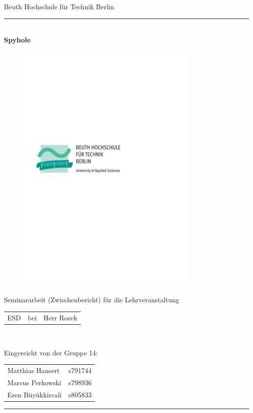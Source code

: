 

\begin{titlepage}
	\begin{center}
		\Large
		Beuth Hochschule für Technik Berlin
		\textcolor{darkBHT}{\rule{\textwidth}{0.2cm}} \\
		\vspace{2 cm}
		\Huge
		\textbf{Spyhole}
		\vspace{2 cm}
		
		\begin{figure}[htbp]
			\centering 
			\includegraphics[width=9cm]{BHT-Logo-Basis.pdf}  
		\end{figure}
		
		\vspace{3cm}
		\Large
		Seminararbeit (Zwischenbericht) für die Lehrveranstaltung \\
		\begin{tabular}{lcl}
			ESD & bei & Herr Rozek\\
		\end{tabular} 
		\\
		\vspace{0.8cm}
		\vspace{0.8cm}
		
		Eingereicht von der Gruppe 14: \\
		\begin{tabular}{ll}
			Matthias Hansert & s791744\\
			Marcus Perkowski & s798936\\
			Eren Büyükkircali & s805833\\
		\end{tabular}

	\end{center}
	\vfill
	\textcolor{darkBHT}{\rule{\textwidth}{0.2cm}}
	\vspace{1 cm}
	\normalsize
	
\end{titlepage}

%
%